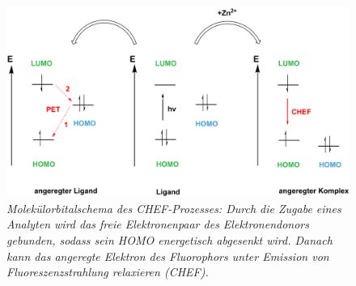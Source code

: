 \documentclass[12pt,a4paper]{report}
\begin{document}
	\begin{figure}[h!]
		\centering
		\includegraphics[width=\textwidth]{PETCHEF.png}
		\caption{\textit{Molekülorbitalschema des CHEF-Prozesses: Durch die Zugabe eines Analyten wird das freie Elektronenpaar des Elektronendonors gebunden, sodass sein HOMO energetisch abgesenkt wird. Danach kann das angeregte Elektron des Fluorophors unter Emission von Fluoreszenzstrahlung relaxieren (CHEF).}}
		\label{fig:CHEF}
	\end{figure} 
\end{document}
